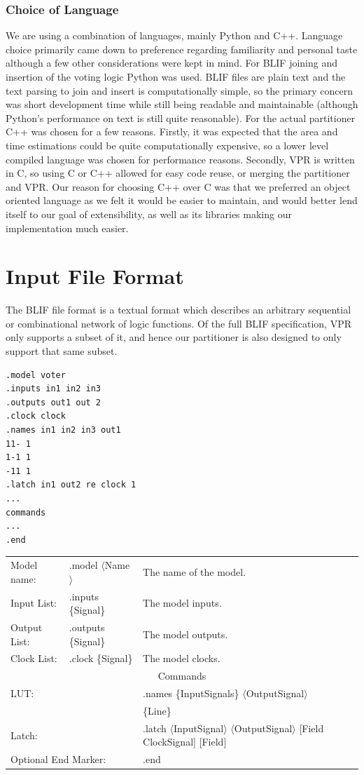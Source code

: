 \documentclass[12pt,final,oneside]{dwThesis} %
\begin{document}
\subsubsection{Choice of Language}
We are using a combination of languages, mainly Python and C++. Language choice primarily came down to preference regarding familiarity and personal taste although a few other considerations were kept in mind.
For \ac{BLIF} joining and insertion of the voting logic Python was used. \ac{BLIF} files are plain text and the text parsing to join and insert is computationally simple, so the primary concern was short development time while still being readable and maintainable (although Python's performance on text is still quite reasonable)\cite{LanguageBenchmark}.
For the actual partitioner C++ was chosen for a few reasons. Firstly, it was expected that the area and time estimations could be quite computationally expensive, so a lower level compiled language was chosen for performance reasons\cite{LanguageBenchmark}. Secondly, \ac{VPR} is written in C, so using C or C++ allowed for easy code reuse, or merging the partitioner and \ac{VPR}. Our reason for choosing C++ over C was that we preferred an object oriented language as we felt it would be easier to maintain, and would better lend itself to our goal of extensibility, as well as its libraries making our implementation much easier.

\section{Input File Format}\label{BLIFSection}
The \ac{BLIF} file format is a textual format which describes an arbitrary sequential or combinational network of logic functions\cite{BLIF}.
Of the full \ac{BLIF} specification, \ac{VPR} only supports a subset of it, and hence our partitioner is also designed to only support that same subset.
\begin{lstlisting}[caption=BLIF file layout, label=SampleBlif]
.model voter
.inputs in1 in2 in3
.outputs out1 out 2
.clock clock
.names in1 in2 in3 out1
11- 1
1-1 1
-11 1
.latch in1 out2 re clock 1
...
commands
...
.end
\end{lstlisting}


\begin{tabular}{lll}
    Model name: & .model $\langle$Name$\rangle$ & The name of the model.\\
    Input List: & .inputs \{Signal\} & The model inputs.\\
    Output List:& .outputs \{Signal\} & The model outputs.\\
    Clock List: & .clock \{Signal\} & The model clocks.\\
    \multicolumn{3}{c}{Commands}\\
    \multicolumn{2}{l}{\ac{LUT}:} & .names \{InputSignals\} $\langle$OutputSignal$\rangle$\\
     &&\{Line\}\\
    \multicolumn{2}{l}{Latch:} & .latch $\langle$InputSignal$\rangle$ $\langle$OutputSignal$\rangle$ [Field ClockSignal] [Field]\\
    \multicolumn{2}{l}{Optional End Marker:} & .end
\end{tabular}
\end{document}
